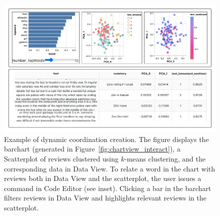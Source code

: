 \begin{figure}[!htb] 
  \centering
  \includegraphics[width=\linewidth]{figures/chart_view.pdf}
  \caption{\small {} Example of dynamic coordination creation. The figure displays the barchart (generated in Figure~\ref{fig:chartview_interact}), a Scatterplot of reviews clustered using $k$-means clustering, and the corresponding data in Data View. To relate a word in the chart with reviews both in Data View and the scatterplot, the user issues a \vital command in Code Editor (see inset). Clicking a bar in the barchart filters reviews in Data View and highlights relevant reviews in the scatterplot. \label{fig:chartview_coordinate}} 
\end{figure}






